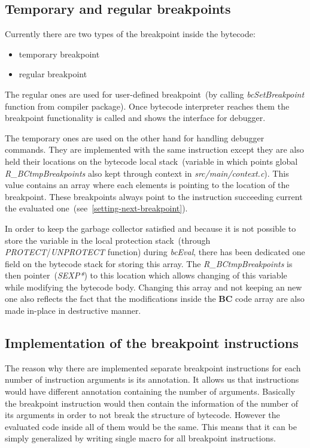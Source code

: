 \documentclass[thesis=M,english]{FITthesis}[2018/10/20]
\begin{document}
\subsection{Temporary and regular breakpoints}

Currently there are two types of the breakpoint inside the bytecode:

\begin{itemize}
	\item temporary breakpoint
	\item regular breakpoint
\end{itemize}
	
The regular ones are used for user-defined breakpoint~(by calling \textit{bcSetBreakpoint} function from {compiler} package). Once bytecode interpreter reaches them the breakpoint functionality is called and shows the interface for debugger.

The temporary ones are used on the other hand for handling debugger commands. They are implemented with the same instruction except they are also held their locations on the bytecode local stack~(variable in which points global \textit{R{\_}BCtmpBreakpoints} also kept through context in \textit{src/main/context.c}). This value contains an array where each elements is pointing to the location of the breakpoint. These breakpoints always point to the instruction succeeding current the evaluated one~(see~\ref{setting-next-breakpoint}).

In order to keep the garbage collector satisfied and because it is not possible to store the variable in the local protection stack~(through \textit{PROTECT}/\textit{UNPROTECT} function) during \textit{bcEval}, there has been dedicated one field on the bytecode stack for storing this array. The \textit{R{\_}BCtmpBreakpoints} is then pointer~(\textit{SEXP*}) to this location which allows changing of this variable while modifying the bytecode body. Changing this array and not keeping an new one also reflects the fact that the modifications inside the \textbf{BC} code array are also made in-place in destructive manner.

\subsection{Implementation of the breakpoint instructions}\label{implementation-of-breakpoint-instruction}

The reason why there are implemented separate breakpoint instructions for each number of instruction arguments is its annotation. It allows us that instructions would have different annotation containing the number of arguments. Basically the breakpoint instruction would then contain the information of the number of its arguments in order to not break the structure of bytecode. However the evaluated code inside all of them would be the same. This means that it can be simply generalized by writing single macro for all breakpoint instructions.
\end{document}
